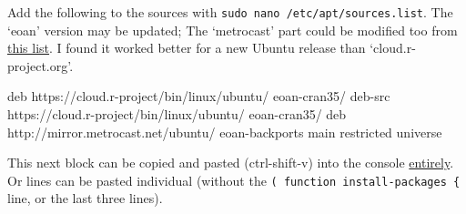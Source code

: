 \documentclass[
]{book}
\newenvironment{Shaded}{\begin{snugshade}}{\end{snugshade}}
\newcommand{\ExtensionTok}[1]{#1}
\newcommand{\NormalTok}[1]{#1}
\begin{document}
Add the following to the sources with \texttt{sudo\ nano\ /etc/apt/sources.list}. The `eoan' version may be updated; The `metrocast' part could be modified too from \href{https://launchpad.net/ubuntu/+archivemirrors}{this list}. I found it worked better for a new Ubuntu release than `cloud.r-project.org'.

\begin{Shaded}
\begin{Highlighting}[]
\ExtensionTok{deb}\NormalTok{ https://cloud.r{-}project/bin/linux/ubuntu/ eoan{-}cran35/}
\ExtensionTok{deb{-}src}\NormalTok{ https://cloud.r{-}project/bin/linux/ubuntu/ eoan{-}cran35/}
\ExtensionTok{deb}\NormalTok{ http://mirror.metrocast.net/ubuntu/ eoan{-}backports main restricted universe}
\end{Highlighting}
\end{Shaded}

This next block can be copied and pasted (ctrl-shift-v) into the console \href{https://stackoverflow.com/a/43164204}{entirely}. Or lines can be pasted individual (without the \texttt{(\ function\ install-packages\ \{} line, or the last three lines).
\end{document}
